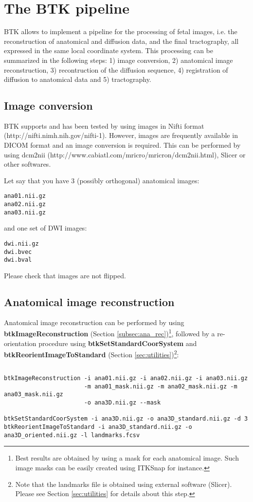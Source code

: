 \section{The BTK pipeline}
BTK allows to implement a pipeline for the processing of fetal images,
i.e. the reconstruction of anatomical and diffusion data, and the final
tractography, all expressed in the same local coordinate system. This
processing can be summarized in the following steps: 1) image conversion, 2) anatomical image reconstruction, 3)
recontruction of the diffusion sequence, 4) registration of diffusion to anatomical data and 5)
tractography.

\subsection{Image conversion}
BTK supports and has been tested by using images in Nifti format
(http://nifti.nimh.nih.gov/nifti-1). However, images are frequently available in
DICOM format and an image conversion is required. This can be performed by using
dcm2nii (http://www.cabiatl.com/mricro/mricron/dcm2nii.html), Slicer or other softwares.

Let say that you have 3 (possibly orthogonal) anatomical images:
\begin{verbatim}
ana01.nii.gz 
ana02.nii.gz 
ana03.nii.gz 
\end{verbatim}

and one set of DWI images: 
\begin{verbatim}
dwi.nii.gz
dwi.bvec 
dwi.bval 
\end{verbatim}


Please check that images are not flipped.

\subsection{Anatomical image reconstruction}
Anatomical image reconstruction can be performed by using \textbf{btkImageReconstruction} (Section
\ref{subsec:ana_rec})\footnote{Best results are obtained by using a mask for each anatomical image. Such image masks can be easily created using ITKSnap for instance.}, followed by a re-orientation procedure using \textbf{btkSetStandardCoorSystem} and \textbf{btkReorientImageToStandard} (Section \ref{sec:utilities})\footnote{Note that the landmarks file is obtained using external software (Slicer). Please see Section \ref{sec:utilities} for details about this step.}:

\begin{verbatim}
 
btkImageReconstruction -i ana01.nii.gz -i ana02.nii.gz -i ana03.nii.gz 
                       -m ana01_mask.nii.gz -m ana02_mask.nii.gz -m ana03_mask.nii.gz
                       -o ana3D.nii.gz --mask

btkSetStandardCoorSystem -i ana3D.nii.gz -o ana3D_standard.nii.gz -d 3
btkReorientImageToStandard -i ana3D_standard.nii.gz -o ana3D_oriented.nii.gz -l landmarks.fcsv

\end{verbatim}



